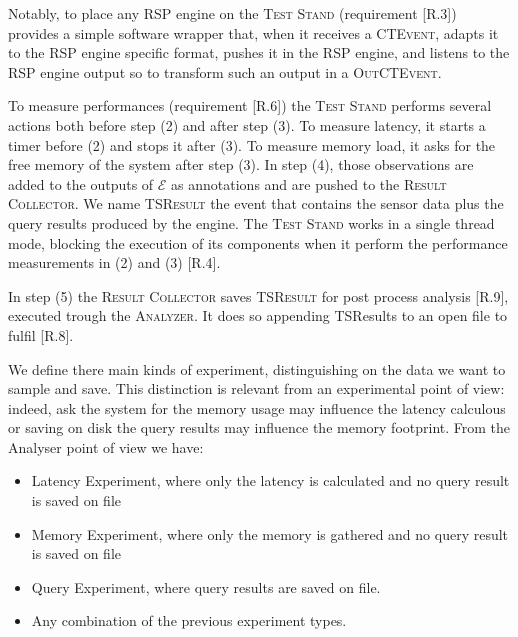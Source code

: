 Notably, to place any RSP engine on the \textsc{Test Stand} (requirement [R.3]) \name provides a simple software wrapper that, when it receives a \textsc{CTEvent}, adapts it to the RSP engine specific format, pushes it in the RSP engine, and listens to the RSP engine output so to transform such an output in a \textsc{OutCTEvent}.

To measure performances (requirement [R.6]) the \textsc{Test Stand} performs several actions both before step (2) and after step (3). To measure latency, it starts a timer before (2) and stops it after (3). To measure memory load, it asks for the free memory of the system after step (3). In step (4), those observations are added to the outputs of $\mathcal{E}$ as annotations and are pushed to the \textsc{Result Collector}.  We name \textsc{TSResult} the event that contains the sensor data plus the query results produced by the engine.  The \textsc{Test Stand} works in a single thread mode, blocking the execution of its components when it perform the performance measurements in (2) and (3) [R.4].  

In step (5) the \textsc{Result Collector} saves \textsc{TSResult} for post process analysis [R.9], executed trough the \textsc{Analyzer}. It does so appending TSResults to an open file to fulfil [R.8].

We define there main kinds of experiment, distinguishing on the data we want to sample and save. This distinction is relevant from an experimental point of view: indeed, ask the system for the memory usage may influence the latency calculous or saving on disk the query results may influence the memory footprint. From the Analyser point of view we have:
\begin{itemize}
\item Latency Experiment, where only the latency is calculated and no query result is saved on file
\item Memory Experiment, where only the memory is gathered and no query result is saved on file
\item Query Experiment, where query results are saved on file.
\item Any combination of the previous experiment types.
\end{itemize}


